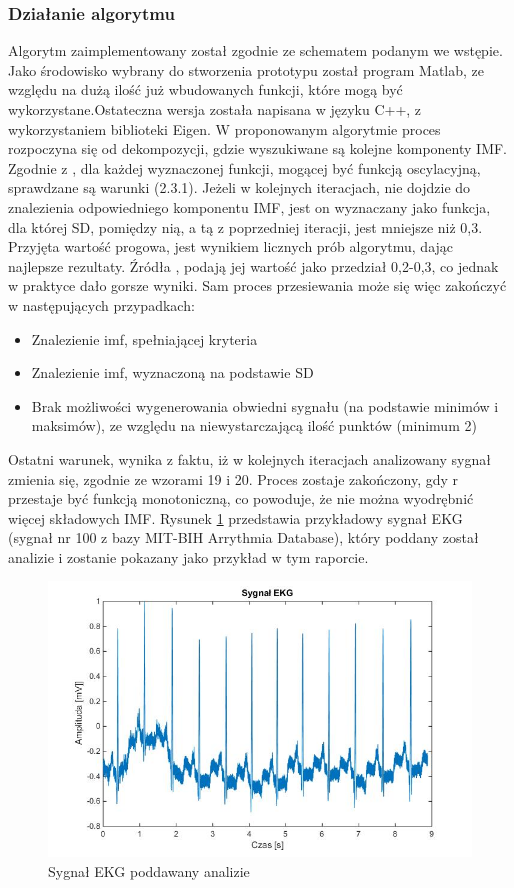 \documentclass[a4paper]{article}
\begin{document}
\subsubsection{Działanie algorytmu}
Algorytm zaimplementowany został zgodnie ze schematem podanym we wstępie. Jako środowisko wybrany do stworzenia prototypu został program Matlab, ze względu na dużą ilość już wbudowanych funkcji, które mogą być wykorzystane.Ostateczna wersja została napisana w języku C++, z wykorzystaniem biblioteki Eigen. W proponowanym algorytmie proces rozpoczyna się od dekompozycji, gdzie wyszukiwane są kolejne komponenty IMF. Zgodnie z \cite{2}, dla każdej wyznaczonej funkcji, mogącej być funkcją oscylacyjną, sprawdzane są warunki (2.3.1). Jeżeli w kolejnych iteracjach, nie dojdzie do znalezienia odpowiedniego komponentu IMF, jest on wyznaczany jako funkcja, dla której SD, pomiędzy nią, a tą z poprzedniej iteracji, jest mniejsze niż 0,3.  Przyjęta wartość progowa, jest wynikiem licznych prób algorytmu, dając najlepsze rezultaty. Źródła \cite{1}, podają jej wartość jako przedział 0,2-0,3, co jednak w praktyce dało gorsze wyniki.  Sam proces przesiewania może się więc zakończyć w następujących przypadkach:
\begin{itemize}
  \item Znalezienie imf, spełniającej kryteria
  \item Znalezienie imf, wyznaczoną na podstawie SD
  \item Brak możliwości wygenerowania obwiedni sygnału (na podstawie minimów i maksimów), ze względu na niewystarczającą ilość punktów (minimum 2)
\end{itemize}
Ostatni warunek, wynika z faktu, iż w kolejnych iteracjach analizowany sygnał zmienia się, zgodnie ze wzorami 19 i 20. 
Proces zostaje zakończony, gdy  r  przestaje być funkcją monotoniczną, co powoduje,   że nie można  wyodrębnić  więcej    składowych  IMF.  Rysunek \ref{emd/rawsignal}   przedstawia przykładowy sygnał EKG (sygnał nr 100 z bazy MIT-BIH Arrythmia Database), który poddany został analizie i zostanie pokazany jako przykład w tym 
raporcie.

\begin{figure}[H]
\centering
\includegraphics[scale=0.5]{emd/rawsignal}
\caption{\label{emd/rawsignal}Sygnał EKG poddawany analizie}
\end{figure}
\end{document}
